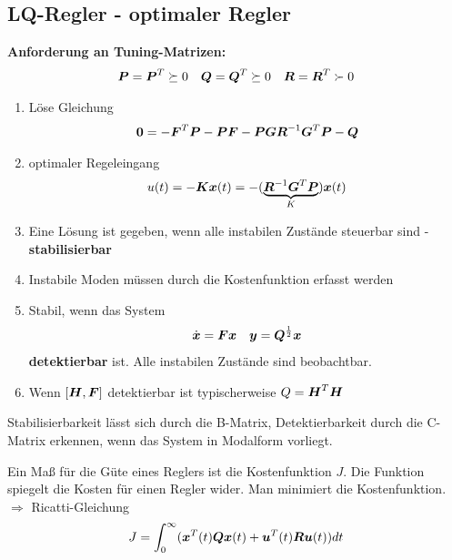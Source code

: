 \subsection{LQ-Regler - optimaler Regler}
\begin{tcolorbox}[colback=white!10!white,colframe=green!30!black] 
    \textbf{Anforderung an Tuning-Matrizen:}
    \begin{align*}
        \boldsymbol{P} = \boldsymbol{P}^T \succeq 0
        && \boldsymbol{Q} = \boldsymbol{Q}^T \succeq 0
        && \boldsymbol{R} = \boldsymbol{R}^T \succ 0
    \end{align*}
    
    \tcblower
    \begin{enumerate}
        \item Löse Gleichung
            \begin{align*}
                \boldsymbol{0} = -\boldsymbol{F}^T\boldsymbol{P} - \boldsymbol{PF}
                - \boldsymbol{PG}\boldsymbol{R}^{-1}\boldsymbol{G}^T\boldsymbol{P} - \boldsymbol{Q}
            \end{align*}
        \item optimaler Regeleingang
        \begin{align*}
            u(t) = - \boldsymbol{Kx}(t) = -(\underbrace{\boldsymbol{R}^{-1}\boldsymbol{G}^T\boldsymbol{P}}_{K})\boldsymbol{x}(t)
        \end{align*}
        \item Eine Lösung ist gegeben, wenn alle instabilen Zustände steuerbar sind  -\textbf{stabilisierbar}
        \item Instabile Moden müssen durch die Kostenfunktion erfasst werden
        \item Stabil, wenn das System \begin{align*}
            \dot{\boldsymbol{x}} = \boldsymbol{Fx} && \boldsymbol{y} = \boldsymbol{Q}^{\frac{1}{2}}\boldsymbol{x} 
        \end{align*}
        \textbf{detektierbar} ist. Alle instabilen Zustände sind beobachtbar.
        \item Wenn $[\boldsymbol{H},\boldsymbol{F}]$ detektierbar ist typischerweise $Q = \boldsymbol{H}^T\boldsymbol{H}$ 
    \end{enumerate}

\begin{tcolorbox}[colback=white!10!white,colframe=gray!30!black] 
    Stabilisierbarkeit lässt sich durch die B-Matrix, Detektierbarkeit durch die C-Matrix erkennen, wenn das System in Modalform vorliegt.
\end{tcolorbox}    
\begin{tcolorbox}[colback=white!10!white,colframe=gray!30!black] 
    Ein Maß für die Güte eines Reglers ist die Kostenfunktion $J$. Die Funktion spiegelt die Kosten  für einen Regler wider. Man minimiert die Kostenfunktion. $\Rightarrow$ Ricatti-Gleichung
    \begin{align*}
        J = \int_{0}^{\infty}(\boldsymbol{x}^T(t)\boldsymbol{Qx}(t)+\boldsymbol{u}^T(t)\boldsymbol{Ru}(t))dt
    \end{align*}
\end{tcolorbox}
\end{tcolorbox}
